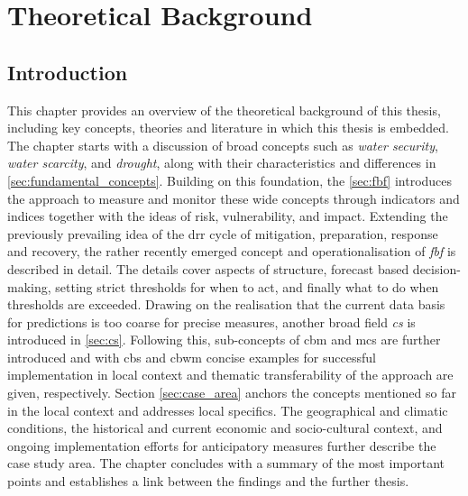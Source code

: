
\chapter{Theoretical Background} %

\label{chapter2} %

\section{Introduction}

This chapter provides an overview of the theoretical background of this thesis, including key concepts, theories and literature in which this thesis is embedded. The chapter starts with a discussion of broad concepts such as \textit{water security}, \textit{water scarcity}, and \textit{drought}, along with their characteristics and differences in \autoref{sec:fundamental_concepts}. Building on this foundation, the \autoref{sec:fbf} introduces the approach to measure and monitor these wide concepts through indicators and indices together with the ideas of risk, vulnerability, and impact. Extending the previously prevailing idea of the \acrfull{drr} cycle of mitigation, preparation, response and recovery, the rather recently emerged concept and operationalisation of \textit{\acrfull{fbf}} is described in detail. The details cover aspects of structure, forecast based decision-making, setting strict thresholds for when to act, and finally what to do when thresholds are exceeded.\newline
Drawing on the realisation that the current data basis for predictions is too coarse for precise measures, another broad field \textit{\acrfull{cs}} is introduced in \autoref{sec:cs}. Following this, sub-concepts of \acrfull{cbm} and \acrfull{mcs} are further introduced and with \acrfull{cbs} and \acrfull{cbwm} concise examples for successful implementation in local context and thematic transferability of the approach are given, respectively.\newline
Section \ref{sec:case_area} anchors the concepts mentioned so far in the local context and addresses local specifics. The geographical and climatic conditions, the historical and current economic and socio-cultural context, and ongoing implementation efforts for anticipatory measures further describe the case study area. The chapter concludes with a summary of the most important points and establishes a link between the findings and the further thesis.

